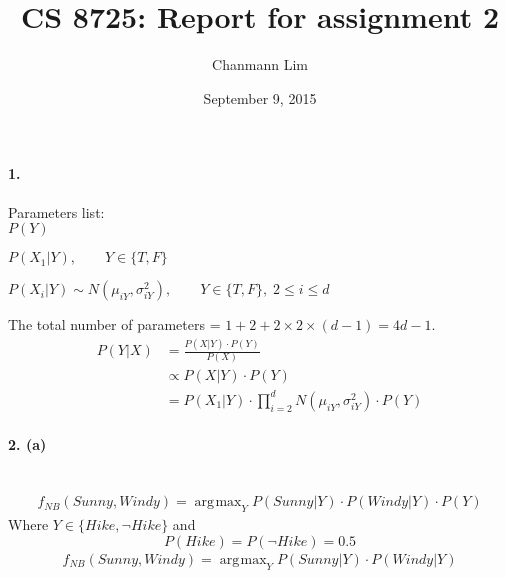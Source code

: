 \documentclass[a4paper]{article}
\DeclareMathOperator*{\argmax}{\arg\!\max}
\begin{document}
\title{CS 8725: Report for assignment 2}
\author{Chanmann Lim}
\date{September 9, 2015}
\maketitle

\paragraph{1.} Parameters list: \\

	$ P(Y) $
	
	$ P(X_1|Y), \qquad Y \in \{T, F\} $
	
	$ P(X_i|Y) \sim N(\mu_{iY}, \sigma_{iY}^2), \qquad Y \in \{T, F\}, \; 2 \leq i \leq d $
	
	The total number of parameters = $1 + 2 + 2 \times 2 \times (d-1) = 4d - 1 $.
	\begin{align}
		P(Y|X) &= \frac{P(X|Y) \cdot P(Y)}{P(X)} \\
			&\propto P(X|Y) \cdot P(Y) \\
			&= P(X_1|Y) \cdot \prod_{i=2}^d N(\mu_{iY}, \sigma_{iY}^2) \cdot P(Y)
	\end{align} 

\paragraph{2. (a)} ~\\
	\begin{align}
		f_{NB}(Sunny, Windy) = \argmax_{Y} P(Sunny|Y) \cdot P(Windy|Y) \cdot P(Y)
	\end{align}
	Where $Y \in \{Hike, \neg Hike\}$ and 
	$$ P(Hike) = P(\neg Hike) = 0.5 $$
	\begin{align}
		f_{NB}(Sunny, Windy) = \argmax_{Y} P(Sunny|Y) \cdot P(Windy|Y)
	\end{align}
	
\end{document}
